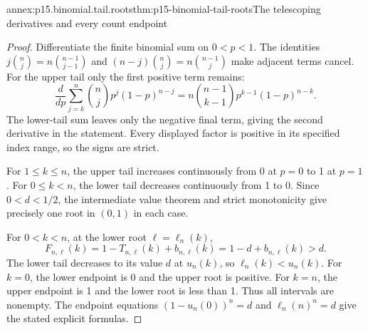 \begin{annexitem}{annex:p15.binomial.tail.roots}{thm:p15-binomial-tail-roots}{The telescoping derivatives and every count endpoint}
\begin{proof}
Differentiate the finite binomial
sum on \(0<p<1\).
The identities
\(j\binom nj=n\binom{n-1}{j-1}\)
and
\((n-j)\binom nj=n\binom{n-1}{j}\)
make adjacent terms cancel.
For the upper tail only the
first positive term remains:
\[
 \frac{d}{dp}\sum_{j=k}^n\binom njp^j(1-p)^{n-j}
              =n\binom{n-1}{k-1}p^{k-1}(1-p)^{n-k}.
\]
The lower-tail sum leaves only
the negative final term, giving
the second derivative in the
statement. Every displayed
factor is positive in its
specified index range, so
the signs are strict.

For \(1\leq k\leq n\),
the upper tail increases
continuously from 0 at
\(p=0\) to 1 at \(p=1\).
For \(0\leq k<n\), the
lower tail decreases continuously
from 1 to 0. Since
\(0<d<1/2\), the intermediate
value theorem and strict
monotonicity give precisely
one root in \((0,1)\) in
each case.

For \(0<k<n\), at the
lower root \(\ell=\ell_n(k)\),
\[
 F_{n,\ell}(k)
       =1-T_{n,\ell}(k)+b_{n,\ell}(k)
       =1-d+b_{n,\ell}(k)>d.
\]
The lower tail decreases
to its value \(d\) at
\(u_n(k)\), so
\(\ell_n(k)<u_n(k)\).
For \(k=0\), the lower
endpoint is 0 and the
upper root is positive.
For \(k=n\), the upper
endpoint is 1 and the
lower root is less than 1.
Thus all intervals are
nonempty. The endpoint
equations
\((1-u_n(0))^n=d\)
and \(\ell_n(n)^n=d\)
give the stated explicit
formulas.
\end{proof}
\end{annexitem}

